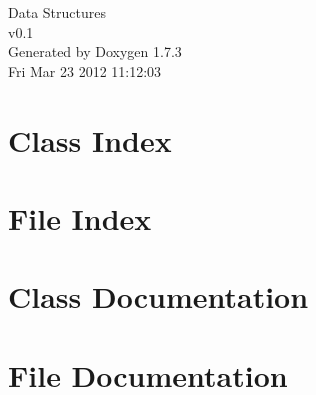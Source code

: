 \documentclass[a4paper]{book}
\begin{document}
\hypersetup{pageanchor=false}
\begin{titlepage}
\vspace*{7cm}
\begin{center}
{\Large Data Structures \\[1ex]\large v0.1 }\\
\vspace*{1cm}
{\large Generated by Doxygen 1.7.3}\\
\vspace*{0.5cm}
{\small Fri Mar 23 2012 11:12:03}\\
\end{center}
\end{titlepage}
\clearemptydoublepage
{}
\tableofcontents
\clearemptydoublepage
{}
\hypersetup{pageanchor=true}
\chapter{Class Index}

\chapter{File Index}

\chapter{Class Documentation}





\chapter{File Documentation}












\printindex
\end{document}
